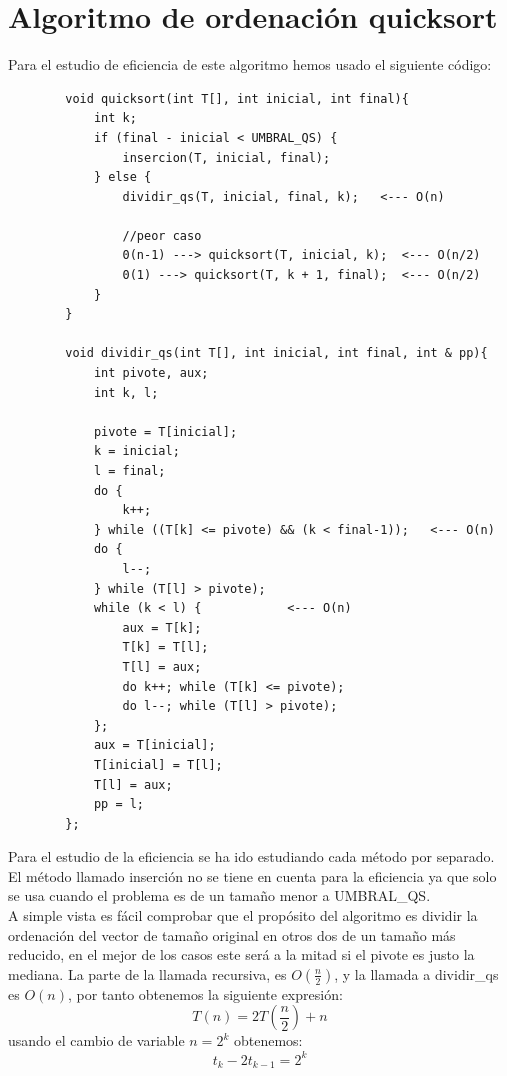 \documentclass[11pt,openany]{book}
\begin{document}
\section*{Algoritmo de ordenación quicksort}
Para el estudio de eficiencia de este algoritmo hemos usado el siguiente código:
\begin{lstlisting}
        void quicksort(int T[], int inicial, int final){
            int k;
            if (final - inicial < UMBRAL_QS) {
                insercion(T, inicial, final);
            } else {
                dividir_qs(T, inicial, final, k);   <--- O(n)

                //peor caso    
                0(n-1) ---> quicksort(T, inicial, k);  <--- O(n/2)
                0(1) ---> quicksort(T, k + 1, final);  <--- O(n/2)
            }
        }

        void dividir_qs(int T[], int inicial, int final, int & pp){
            int pivote, aux;
            int k, l;

            pivote = T[inicial];
            k = inicial;
            l = final;
            do {
                k++;
            } while ((T[k] <= pivote) && (k < final-1));   <--- O(n)
            do {
                l--;
            } while (T[l] > pivote);
            while (k < l) {            <--- O(n)
                aux = T[k];
                T[k] = T[l];
                T[l] = aux;
                do k++; while (T[k] <= pivote);
                do l--; while (T[l] > pivote);
            };
            aux = T[inicial];
            T[inicial] = T[l];
            T[l] = aux;
            pp = l;
        };
        \end{lstlisting}
Para el estudio de la eficiencia se ha ido estudiando cada método por separado. El método llamado inserción
no se tiene en cuenta para la eficiencia ya que solo se usa cuando el problema es de un tamaño menor a UMBRAL\_QS.\\
A simple vista es fácil comprobar que el propósito del algoritmo es dividir la ordenación del vector de tamaño
original en otros dos de un tamaño más reducido, en el mejor de los casos este será a la mitad si el pivote es
justo la mediana. La parte de la llamada recursiva, es $O(\frac{n}{2})$, y la llamada a dividir\_qs es $O(n)$, por tanto obtenemos
la siguiente expresión:
\begin{equation*}
    T(n) = 2 T\left(\frac{n}{2}\right) + n
\end{equation*}
usando el cambio de variable $n=2^k$ obtenemos:
\begin{equation*}
    t_k - 2t_{k-1} = 2^k
\end{equation*}
\end{document}
